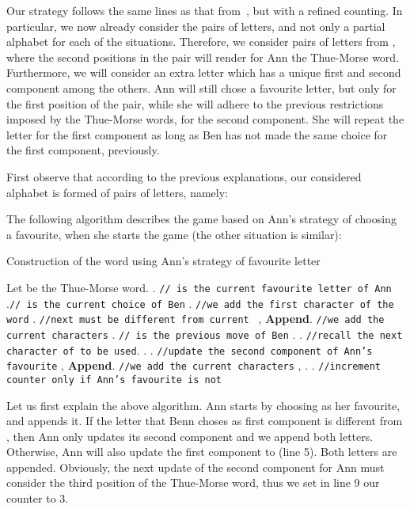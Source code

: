 \documentclass[runningheads,fleqn]{llncs}
\begin{document}
Our strategy follows the same lines as that from~\cite{GryKosZma15}, but with a refined counting. In particular, we now already consider the pairs of letters, and not only a partial alphabet for each of the situations. Therefore, we consider pairs of letters from , where the second positions in the pair will render for Ann the Thue-Morse word. Furthermore, we will consider an extra letter  which has a unique first and second component among the others.
Ann will still chose a favourite letter, but only for the first position of the pair, while she will adhere to the previous restrictions imposed by the Thue-Morse words, for the second component. She will repeat the letter for the first component as long as Ben has not made the same choice for the first component, previously.

First observe that according to the previous explanations, our considered alphabet is formed of pairs of letters, namely:



The following algorithm describes the game based on Ann's  strategy of choosing a favourite, when she starts the game (the other situation is similar):

\begin{algorithm}[h!]
\caption{Construction of the word using Ann's strategy of favourite letter}
\begin{algorithmic}[1]\label{minper}
\STATE Let  be the Thue-Morse word.
\STATE .		\hfill {\scriptsize \tt// is the current favourite letter of Ann}
\STATE .\hfill {\scriptsize \tt// is the current choice of Ben}
. \hfill {\scriptsize \tt//we add the first character of the word}
\STATE .	\hfill {\scriptsize \tt//next  must be different from current }
, {\bf Append}. \hfill {\scriptsize \tt//we add the current characters}
\STATE . \hfill {\scriptsize \tt// is the previous move of Ben}
\STATE .
\STATE .		\hfill {\scriptsize \tt//recall the next character of  to be used}.
	\IF {}
		\STATE .
	\ELSIF {}
		\STATE .
	\ELSE 
	\STATE {} \hfill{\scriptsize \tt{/}{/}update the second component of Ann's favourite}
	\ENDIF
{}, {\bf Append}. \hfill {\scriptsize \tt//we add the current characters}
\STATE , .
\IF {}	
	\STATE  . \hfill {\scriptsize \tt//increment counter only if Ann's favourite is not }
\ENDIF
\ENDWHILE
\end{algorithmic}
\end{algorithm}

Let us first explain the above algorithm. Ann starts by choosing  as her favourite, and appends it. If the letter that Benn choses as first component is different from , then Ann only updates its second component and we append both letters. Otherwise, Ann will also update the first component to  (line 5). Both letters are appended. Obviously, the next update of the second component for Ann must consider the third position of the Thue-Morse word, thus we set in line 9 our counter to 3.
\end{document}

